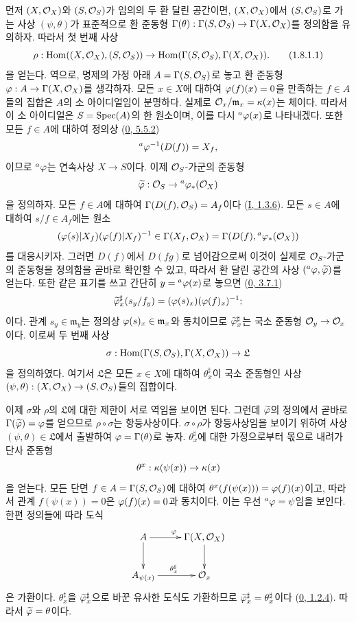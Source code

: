 먼저 $(X,\mathcal{O}_X)$와 $(S,\mathcal{O}_S)$가 임의의 두 환 달린 공간이면,
$(X,\mathcal{O}_X)$에서 $(S,\mathcal{O}_S)$로 가는 사상 $(\psi,\theta)$가
표준적으로 환 준동형
$\Gamma(\theta):\Gamma(S,\mathcal{O}_S)\to\Gamma(X,\mathcal{O}_X)$를 정의함을
유의하자. 따라서 첫 번째 사상
\begin{equation}
\label{ega2:addendum:I.1.8.1.1-ko}
  \rho:\operatorname{Hom}((X,\mathcal{O}_X),(S,\mathcal{O}_S))
  \to\operatorname{Hom}(\Gamma(S,\mathcal{O}_S),\Gamma(X,\mathcal{O}_X)).
\tag{1.8.1.1}
\end{equation}
을 얻는다. 역으로, 명제의 가정 아래 $A=\Gamma(S,\mathcal{O}_S)$로 놓고
환 준동형 $\varphi:A\to\Gamma(X,\mathcal{O}_X)$를 생각하자. 모든 $x\in X$에
대하여 $\varphi(f)(x)=0$을 만족하는 $f\in A$들의 집합은 $A$의 소
아이디얼임이 분명하다. 실제로 $\mathcal{O}_x/\mathfrak m_x=\kappa(x)$는 체이다.
따라서 이 소 아이디얼은 $S=\operatorname{Spec}(A)$의 한 원소이며, 이를 다시
${}^a\varphi(x)$로 나타내겠다. 또한 모든 $f\in A$에 대하여 정의상
(\hyperref[0.5.5.2-ko]{0, 5.5.2})
\[
  {}^a\varphi^{-1}(D(f))=X_f,
\]
이므로 ${}^a\varphi$는 연속사상 $X\to S$이다. 이제 $\mathcal{O}_S$-가군의
준동형
\[
  \widetilde{\varphi}:\mathcal{O}_S\to{}^a\varphi_*(\mathcal{O}_X)
\]
을 정의하자. 모든 $f\in A$에 대하여
$\Gamma(D(f),\mathcal{O}_S)=A_f$이다
(\hyperref[I.1.3.6-ko]{I, 1.3.6}). 모든 $s\in A$에 대하여
$s/f\in A_f$에는 원소
\[
  (\varphi(s)|X_f)(\varphi(f)|X_f)^{-1}
  \in\Gamma(X_f,\mathcal{O}_X)
  =\Gamma(D(f),{}^a\varphi_*(\mathcal{O}_X))
\]
를 대응시키자. 그러면 $D(f)$에서 $D(fg)$로 넘어감으로써 이것이 실제로
$\mathcal{O}_S$-가군의 준동형을 정의함을 곧바로 확인할 수 있고, 따라서 환
달린 공간의 사상 $({}^a\varphi,\widetilde{\varphi})$를 얻는다. 또한 같은
표기를 쓰고 간단히 $y={}^a\varphi(x)$로 놓으면
(\hyperref[0.3.7.1-ko]{0, 3.7.1})
\[
  \widetilde{\varphi}_x^\sharp(s_y/f_y)
  =(\varphi(s)_x)(\varphi(f)_x)^{-1};
\]
이다. 관계 $s_y\in\mathfrak m_y$는 정의상
$\varphi(s)_x\in\mathfrak m_x$와 동치이므로
$\widetilde{\varphi}_x^\sharp$는 국소 준동형
$\mathcal{O}_y\to\mathcal{O}_x$이다. 이로써 두 번째 사상
\[
  \sigma:\operatorname{Hom}(\Gamma(S,\mathcal{O}_S),\Gamma(X,\mathcal{O}_X))\to\mathfrak L
\]
을 정의하였다. 여기서 $\mathfrak L$은 모든 $x\in X$에 대하여
$\theta_x^\sharp$이 국소 준동형인 사상
$(\psi,\theta):(X,\mathcal{O}_X)\to(S,\mathcal{O}_S)$들의 집합이다.

이제 $\sigma$와 $\rho$의 $\mathfrak L$에 대한 제한이 서로 역임을
보이면 된다. 그런데 $\widetilde{\varphi}$의 정의에서 곧바로
$\Gamma(\widetilde{\varphi})=\varphi$를 얻으므로 $\rho\circ\sigma$는
항등사상이다. $\sigma\circ\rho$가 항등사상임을 보이기 위하여 사상
$(\psi,\theta)\in\mathfrak L$에서 출발하여
$\varphi=\Gamma(\theta)$로 놓자. $\theta_x^\sharp$에 대한 가정으로부터
몫으로 내려가 단사 준동형
\[
  \theta^x:\kappa(\psi(x))\to\kappa(x)
\]
을 얻는다. 모든 단면 $f\in A=\Gamma(S,\mathcal{O}_S)$에 대하여
$\theta^x(f(\psi(x)))=\varphi(f)(x)$이고, 따라서 관계
$f(\psi(x))=0$은 $\varphi(f)(x)=0$과 동치이다. 이는 우선
${}^a\varphi=\psi$임을 보인다. 한편 정의들에 따라 도식
\[
  \xymatrix{
    A\ar[r]^\vphi\ar[d] &
    \Gamma(X,\sh{O}_X)\ar[d]\\
    A_{\psi(x)}\ar[r]^{\theta_x^\sharp} &
    \sh{O}_x
  }
\]
은 가환이다. $\theta_x^\sharp$을
$\widetilde{\varphi}_x^\sharp$으로 바꾼 유사한 도식도 가환하므로
$\widetilde{\varphi}_x^\sharp=\theta_x^\sharp$이다
(\hyperref[0.1.2.4-ko]{0, 1.2.4}). 따라서
$\widetilde{\varphi}=\theta$이다.

